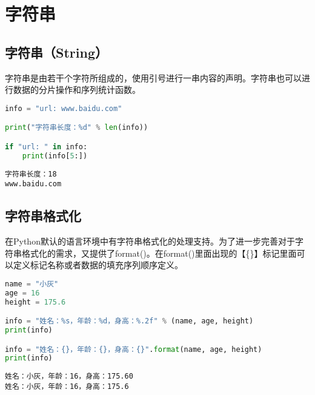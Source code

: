 \newpage

\section{字符串}

\subsection{字符串（String）}

字符串是由若干个字符所组成的，使用引号进行一串内容的声明。字符串也可以进行数据的分片操作和序列统计函数。\\


\begin{lstlisting}[language=Python]
info = "url: www.baidu.com"

print("字符串长度：%d" % len(info))

if "url: " in info:
    print(info[5:])
\end{lstlisting}

\begin{tcolorbox}
	\begin{verbatim}
字符串长度：18
www.baidu.com
\end{verbatim}
\end{tcolorbox}

\vspace{0.5cm}

\subsection{字符串格式化}

在Python默认的语言环境中有字符串格式化的处理支持。为了进一步完善对于字符串格式化的需求，又提供了format()。在format()里面出现的【\{\}】标记里面可以定义标记名称或者数据的填充序列顺序定义。\\


\begin{lstlisting}[language=Python]
name = "小灰"
age = 16
height = 175.6

info = "姓名：%s，年龄：%d，身高：%.2f" % (name, age, height)
print(info)

info = "姓名：{}，年龄：{}，身高：{}".format(name, age, height)
print(info)
\end{lstlisting}

\begin{tcolorbox}
	\begin{verbatim}
姓名：小灰，年龄：16，身高：175.60
姓名：小灰，年龄：16，身高：175.6
\end{verbatim}
\end{tcolorbox}

